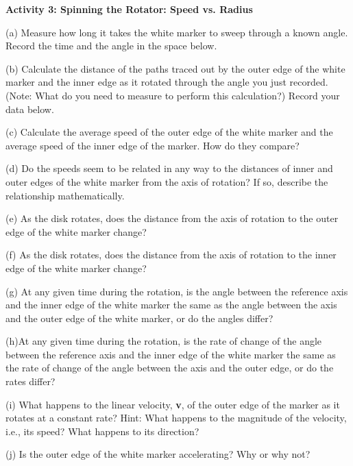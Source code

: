 \textbf{Activity 3: Spinning the Rotator: Speed vs. Radius} 

(a) Measure how long it takes the white marker to sweep through a known angle.
Record the time and the angle in the space below.
\vspace{10mm}

(b) Calculate the distance of the paths traced out by the outer edge of the white marker and the inner edge as it rotated through the angle you just recorded.
(Note: What do you need to measure to perform this calculation?) Record your
data below.
\vspace{20mm}

(c) Calculate the average speed of the outer edge of the white marker and the
average speed of the inner edge of the marker. How do they compare?
\vspace{20mm}

(d) Do the speeds seem to be related in any way to the distances of inner and
outer edges of the white marker from the axis of rotation? If so, describe the
relationship mathematically.
\vspace{20mm}

(e) As the disk rotates, does the distance from the axis of rotation to the outer edge of the white marker change?
\vspace{10mm}

(f) As the disk rotates, does the distance from the axis of rotation to the inner edge of the white marker change?
\vspace{10mm}

(g) At any given time during the rotation, is the angle between the reference
axis and the inner edge of the white marker the same as the angle between the
axis and the outer edge of the white marker, or do the angles differ?
\vspace{10mm}

(h)At any given time during the rotation, is the rate of change of the angle
between the reference axis and the inner edge of the white marker the same as
the rate of change of the angle between the axis and the outer edge, or do the
rates differ?
\vspace{10mm}

(i) What happens to the linear velocity, \textbf{v}, of the outer edge of the
marker as it rotates at a constant rate? Hint: What happens to the magnitude
of the velocity, i.e., its speed? What happens to its direction?
\vspace{20mm}

(j) Is the outer edge of the white marker accelerating? Why or why not?
\vspace{20mm}

